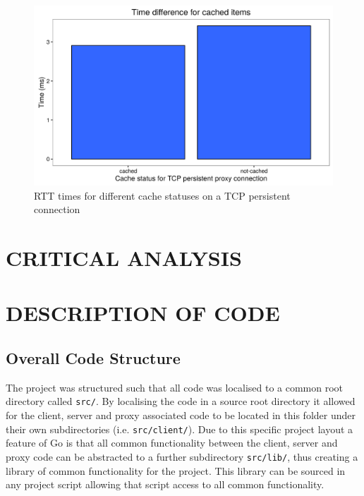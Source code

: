 \documentclass[10pt,twocolumn]{witseiepaper}
\begin{document}
		\begin{figure}[htbp]
			\centering
			\includegraphics[width=\columnwidth]{resources/RTT_cache.png}
			\caption{RTT times for different cache statuses on a TCP persistent connection}
			\label{fig:rtt_cache}
		\end{figure}


\section{CRITICAL ANALYSIS}


\section{DESCRIPTION OF CODE}

	\subsection{Overall Code Structure}

		The project was structured such that all code was localised to a common root directory called \texttt{src/}. By localising the code in a source root directory it allowed for the client, server and proxy associated code to be located in this folder under their own subdirectories (i.e. \texttt{src/client/}). Due to this specific project layout a feature of Go is that all common functionality between the client, server and proxy code can be abstracted to a further subdirectory \texttt{src/lib/}, thus creating a library of common functionality for the project. This library can be sourced in any project script allowing that script access to all common functionality.\\
		
\end{document}
